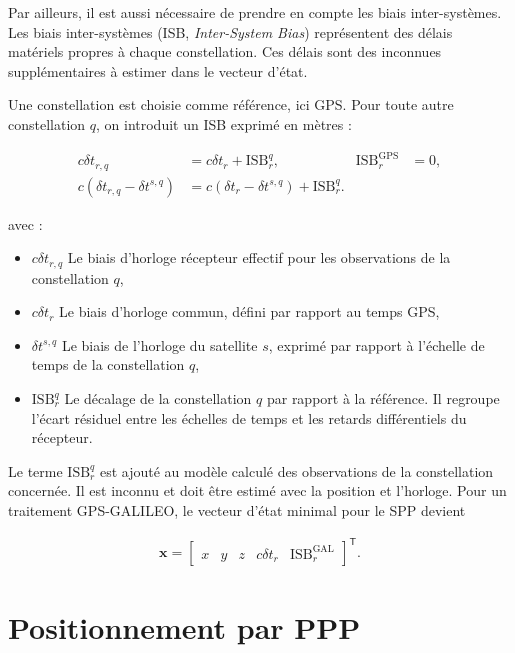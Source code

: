 Par ailleurs, il est aussi nécessaire de prendre en compte les biais inter-systèmes.
Les biais inter-systèmes (ISB, \textit{Inter-System Bias}) représentent des
délais matériels propres à chaque constellation. Ces délais sont des inconnues
supplémentaires à estimer dans le vecteur d'état.

Une constellation est choisie comme référence, ici GPS. Pour toute autre
constellation $q$, on introduit un ISB exprimé en mètres :

\begin{align}
c\delta t_{r,q}
&=
c\delta t_r+\mathrm{ISB}_{r}^{q},
&
\mathrm{ISB}_{r}^{\mathrm{GPS}}
&=0,
\\
c\left(\delta t_{r,q}-\delta t^{s,q}\right)
&=
c\left(\delta t_r-\delta t^{s,q}\right)
+\mathrm{ISB}_{r}^{q}.
\label{eq:isb_definition}
\end{align}

avec :

\begin{itemize}
    \item $c\delta t_{r,q}$ Le biais d'horloge récepteur effectif pour les
    observations de la constellation $q$,
    \item $c\delta t_r$ Le biais d'horloge commun, défini par rapport au temps
    GPS,
    \item $\delta t^{s,q}$ Le biais de l'horloge du satellite $s$, exprimé par
    rapport à l'échelle de temps de la constellation $q$,
    \item $\mathrm{ISB}_{r}^{q}$ Le décalage de la constellation $q$ par
    rapport à la référence. Il regroupe l'écart résiduel entre les échelles de
    temps et les retards différentiels du récepteur.
\end{itemize}

Le terme $\mathrm{ISB}_{r}^{q}$ est ajouté au modèle calculé des observations
de la constellation concernée. Il est inconnu et doit être estimé avec la
position et l'horloge. Pour un traitement GPS-GALILEO, le vecteur d'état
minimal pour le SPP devient

\begin{align}
\mathbf x
=
\begin{bmatrix}
x & y & z &
c\delta t_r &
\mathrm{ISB}_{r}^{\mathrm{GAL}}
\end{bmatrix}^{\mathsf T}.
\label{eq:multiconstellation_state}
\end{align}

\section{Positionnement par PPP}

